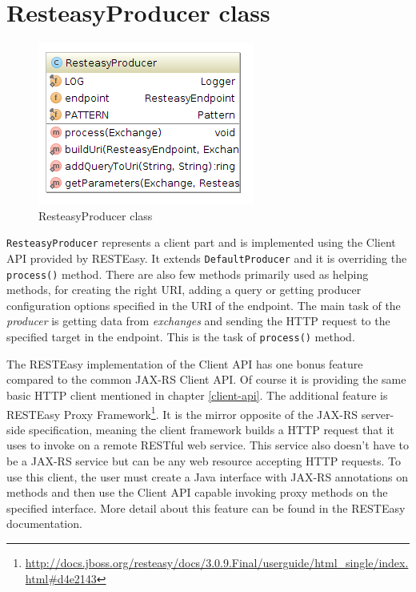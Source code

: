 \documentclass[12pt,final,oneside]{fithesis2}
\begin{document}
\section{ResteasyProducer class}\label{producer}
\begin{figure}[h]
\centering
\includegraphics[width=0.6\linewidth]{images/producer.png}
\caption{ResteasyProducer class}
\label{comp}
\end{figure}

\texttt{ResteasyProducer} represents a client part and is implemented using the Client API provided by RESTEasy. It extends \texttt{DefaultProducer} and it is overriding the \texttt{process()} method. There are also few methods  primarily used as helping methods, for creating the right URI, adding a query or getting producer configuration options specified in the URI of the endpoint. The main task of the \textit{producer} is getting data from \textit{exchanges} and sending the HTTP request to the specified target in the endpoint. This is the task of \texttt{process()} method. 

The RESTEasy implementation of the Client API has one bonus feature compared to the common JAX-RS Client API. Of course it is providing the same basic HTTP client mentioned in chapter \ref{client-api}. The additional feature is RESTEasy Proxy Framework\footnote{\url{http://docs.jboss.org/resteasy/docs/3.0.9.Final/userguide/html_single/index.html\#d4e2143}}. It is the mirror opposite of the JAX-RS server-side specification, meaning the client framework builds a HTTP request that it uses to invoke on a remote RESTful web service. This service also doesn't have to be a JAX-RS service but can be any web resource accepting HTTP requests. To use this client, the user must create a Java interface with JAX-RS annotations on methods and then use the Client API capable invoking proxy methods on the specified interface\cite{resteasy-doc}. More detail about this feature can be found in the RESTEasy documentation. 
\end{document}
